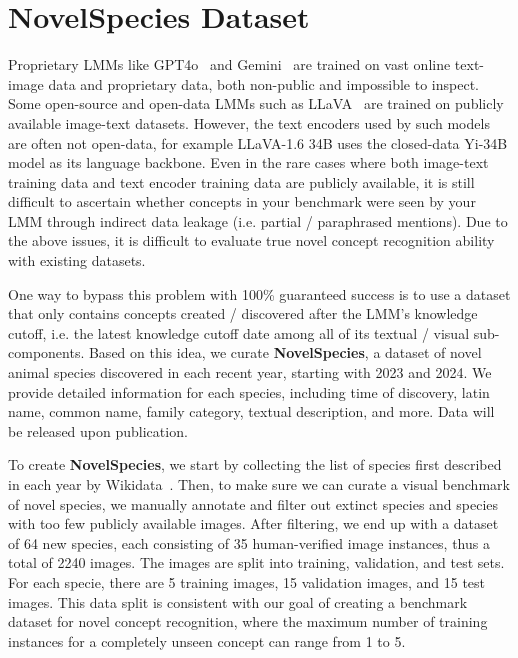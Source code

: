 \section{NovelSpecies Dataset}
\label{sec:novel_dataset}

Proprietary LMMs like GPT4o~\cite{hurst2024gpt4o} and Gemini~\cite{team2023gemini} are trained on vast online text-image data and proprietary data, both non-public and impossible to inspect. Some open-source and open-data LMMs such as LLaVA~\cite{liu2024improved, liu2024visual} are trained on publicly available image-text datasets. However, the text encoders used by such models are often not open-data, for example LLaVA-1.6 34B uses the closed-data Yi-34B model as its language backbone. Even in the rare cases where both image-text training data and text encoder training data are publicly available, it is still difficult to ascertain whether concepts in your benchmark were seen by your LMM through indirect data leakage (i.e. partial / paraphrased mentions). Due to the above issues, it is difficult to evaluate true novel concept recognition ability with existing datasets. 

One way to bypass this problem with 100\% guaranteed success is to use a dataset that only contains concepts created / discovered after the LMM's knowledge cutoff, i.e. the latest knowledge cutoff date among all of its textual / visual sub-components. Based on this idea, we curate \textbf{NovelSpecies}, a dataset of novel animal species discovered in each recent year, starting with 2023 and 2024. We provide detailed information for each species, including time of discovery, latin name, common name, family category, textual description, and more. Data will be released upon publication.

To create \textbf{NovelSpecies}, we start by collecting the list of species first described in each year by Wikidata~\cite{wikidata}. Then, to make sure we can curate a visual benchmark of novel species, we manually annotate and filter out extinct species and species with too few publicly available images. After filtering, we end up with a dataset of 64 new species, each consisting of 35 human-verified image instances, thus a total of 2240 images. The images are split into training, validation, and test sets. For each specie, there are 5 training images, 15 validation images, and 15 test images. This data split is consistent with our goal of creating a benchmark dataset for novel concept recognition, where the maximum number of training instances for a completely unseen concept can range from 1 to 5.







